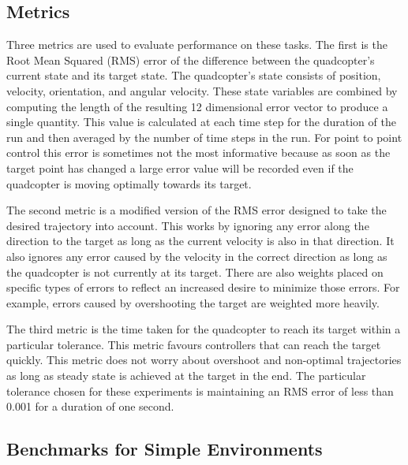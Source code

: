 \documentclass[letterpaper,12pt,titlepage,oneside,final]{book}
\begin{document}
\subsection{Metrics}

Three metrics are used to evaluate performance on these tasks. 
The first is the Root Mean Squared (RMS) error of the difference between the quadcopter's current state and its target state.
The quadcopter's state consists of position, velocity, orientation, and angular velocity.
These state variables are combined by computing the length of the resulting 12 dimensional error vector to produce a single quantity.
This value is calculated at each time step for the duration of the run and then averaged by the number of time steps in the run.
For point to point control this error is sometimes not the most informative because as soon as the target point has changed a large error value will be recorded even if the quadcopter is moving optimally towards its target.

The second metric is a modified version of the RMS error designed to take the desired trajectory into account.
This works by ignoring any error along the direction to the target as long as the current velocity is also in that direction.
It also ignores any error caused by the velocity in the correct direction as long as the quadcopter is not currently at its target.
There are also weights placed on specific types of errors to reflect an increased desire to minimize those errors.
For example, errors caused by overshooting the target are weighted more heavily.

The third metric is the time taken for the quadcopter to reach its target within a particular tolerance. 
This metric favours controllers that can reach the target quickly.
This metric does not worry about overshoot and non-optimal trajectories as long as steady state is achieved at the target in the end.
The particular tolerance chosen for these experiments is maintaining an RMS error of less than 0.001 for a duration of one second.



\subsection{Benchmarks for Simple Environments}
\end{document}
